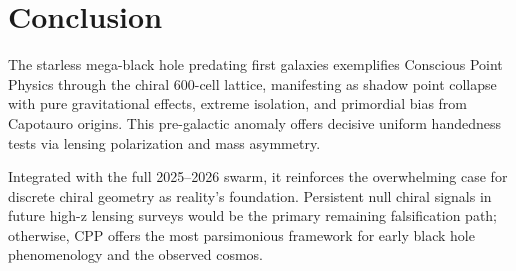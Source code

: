 \documentclass[11pt]{article}
\begin{document}
\section{Conclusion}
The starless mega-black hole predating first galaxies exemplifies Conscious Point Physics through the chiral 600-cell lattice, manifesting as shadow point collapse with pure gravitational effects, extreme isolation, and primordial bias from Capotauro origins. This pre-galactic anomaly offers decisive uniform handedness tests via lensing polarization and mass asymmetry.  

Integrated with the full 2025--2026 swarm, it reinforces the overwhelming case for discrete chiral geometry as reality's foundation. Persistent null chiral signals in future high-z lensing surveys would be the primary remaining falsification path; otherwise, CPP offers the most parsimonious framework for early black hole phenomenology and the observed cosmos.
\end{document}

